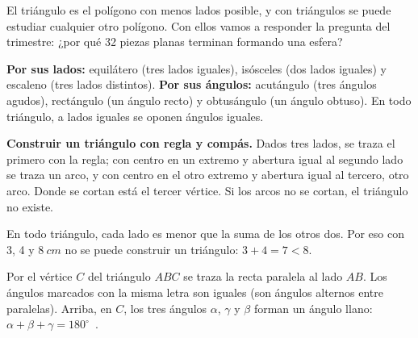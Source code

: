 \documentclass[11pt]{article}
\begin{document}
\label{tema:triangulos}

\begin{hilo}
El triángulo es el polígono con menos lados posible, y con triángulos se puede estudiar
cualquier otro polígono. Con ellos vamos a responder la pregunta del trimestre: ¿por qué 32
piezas planas terminan formando una esfera?
\end{hilo}

\begin{definicion}
\textbf{Por sus lados:} equilátero (tres lados iguales), isósceles (dos lados iguales) y escaleno
(tres lados distintos). \textbf{Por sus ángulos:} acutángulo (tres ángulos agudos), rectángulo
(un ángulo recto) y obtusángulo (un ángulo obtuso). En todo triángulo, a lados iguales se
oponen ángulos iguales.
\end{definicion}

\textbf{Construir un triángulo con regla y compás.} Dados tres lados, se traza el primero con la
regla; con centro en un extremo y abertura igual al segundo lado se traza un arco, y con centro
en el otro extremo y abertura igual al tercero, otro arco. Donde se cortan está el tercer vértice.
Si los arcos no se cortan, el triángulo no existe.

\begin{teorema}
En todo triángulo, cada lado es menor que la suma de los otros dos. Por eso con 3, 4 y
$\qty{8}{cm}$ no se puede construir un triángulo: $3 + 4 = 7 < 8$.
\end{teorema}

\begin{teorema}
Por el vértice $C$ del triángulo $ABC$ se traza la recta paralela al lado $AB$. Los ángulos
marcados con la misma letra son iguales (son ángulos alternos entre paralelas). Arriba, en $C$,
los tres ángulos $\alpha$, $\gamma$ y $\beta$ forman un ángulo llano: $\alpha + \beta + \gamma =
180^\circ$~\cite{euclides}.

\begin{center}
\end{center}
\end{teorema}
\end{document}
